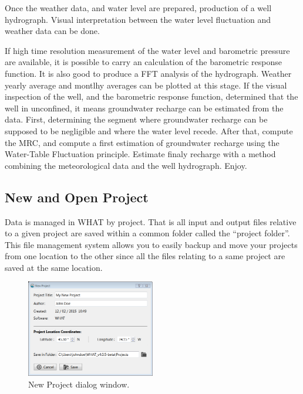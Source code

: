 \documentclass[12pt, letterpaper, fleqn]{report}
\begin{document}
Once the weather data, and water level are prepared, production of a well hydrograph. Visual interpretation between the water level  fluctuation and weather data can be done.

If high time resolution measurement of the water level and barometric pressure are available, it is possible to carry an calculation of the barometric response function. It is also good to produce a FFT analysis of the hydrograph.
Weather yearly average and montlhy averages can be plotted at this stage.
If the visual inspection of the well, and the barometric response function, determined that the well in unconfined, it means groundwater recharge can be estimated from the data. First, determining the segment where groundwater recharge can be supposed to be negligible and where the water level recede. After that, compute the MRC, and compute a first estimation of groundwater recharge using the Water-Table Fluctuation principle. Estimate finaly recharge with a method combining the meteorological data and the well hydrograph. Enjoy.

\subsection{New and Open Project}

Data is managed in WHAT by project. That is all input and output files relative to a given project are saved within a common folder called the ``project folder''. This file management system allows you to easily backup and move your projects from one location to the other since all the files relating to a same project are saved at the same location.

\begin{figure}[h!]
\centering
\includegraphics[width=0.5\textwidth]{WHAT_Screenshot_newproject}
\caption[New Project dialog window.]{New Project dialog window.}
\label{fig:new_proj_win}
\end{figure}
\end{document}
